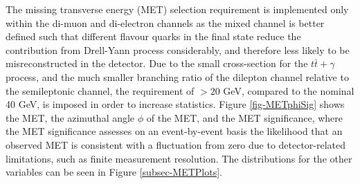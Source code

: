 The missing transverse energy (MET) selection requirement is implemented only within the di-muon and di-electron channels as the mixed channel is better defined such that different flavour quarks in the final state reduce the contribution from Drell-Yann process considerably, and therefore less likely to be misreconstructed in the detector. Due to the small cross-section for the $t\bar{t}+\gamma$ process, and the much smaller branching ratio of the dilepton channel relative to the semileptonic channel, the requirement of $>20$ GeV, compared to the nominal 40 GeV, is imposed in order to increase statistics. Figure \ref{fig-METphiSig} shows the MET, the azimuthal angle $\phi$ of the MET, and the MET significance, where the MET significance assesses on an event-by-event basis the likelihood that an observed MET is consistent with a fluctuation from zero due to detector-related limitations, such as finite measurement resolution. The distributions for the other variables can be seen in Figure \ref{subsec-METPlots}.


